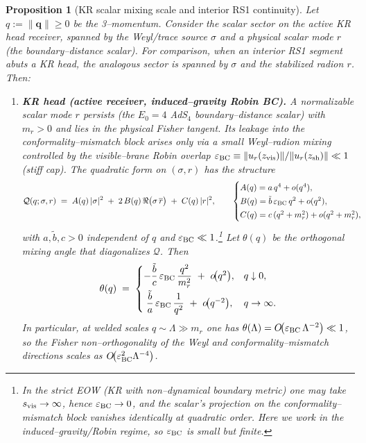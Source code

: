 \documentclass[10pt]{article}
\theoremstyle{definition}
\theoremstyle{plain}
\newtheorem{proposition}{Proposition}[section]
\begin{document}
\begin{proposition}[KR scalar mixing scale and interior RS1 continuity]
\label{prop:scalar-mix}
Let $q:=\|\mathbf q\|\ge 0$ be the 3–momentum. Consider the \emph{scalar} sector on the active KR head
receiver, spanned by the Weyl/trace source $\sigma$ and a physical scalar mode $r$ (the
boundary–distance scalar). For comparison, when an interior RS1 segment abuts a KR head,
the analogous sector is spanned by $\sigma$ and the stabilized radion $r$. Then:
\begin{enumerate}[leftmargin=2.0em,label=(\roman*)]

\item \textbf{KR head (active receiver, induced–gravity Robin BC).}
A normalizable scalar mode $r$ \emph{persists} (the $E_0=4$ AdS$_4$ boundary–distance scalar) with
$m_r>0$ and lies in the \emph{physical} Fisher tangent. Its leakage into the conformality–mismatch
block arises only via a small Weyl–radion mixing controlled by the visible–brane Robin overlap
$\varepsilon_{\rm BC}\equiv \|u_r(z_{\rm vis})\|/\|u_r(z_{\rm sh})\|\ll 1$ (stiff cap).
The quadratic form on $(\sigma,r)$ has the structure
\begin{equation}
\label{eq:KR-ABC-scaling}
\mathcal Q(q;\sigma,r)\;=\;
A(q)\,|\sigma|^2\;+\;2\,B(q)\,\Re\big(\sigma\,\overline{r}\big)\;+\;C(q)\,|r|^2,
\qquad
\begin{cases}
A(q)=a\,q^{4}+o(q^{4}),\\[2pt]
B(q)=\tilde b\,\varepsilon_{\rm BC}\,q^{2}+o(q^{2}),\\[2pt]
C(q)=c\,(q^{2}+m_{r}^{2})+o(q^{2}+m_{r}^{2}),
\end{cases}
\end{equation}
with $a,\tilde b,c>0$ independent of $q$ and $\varepsilon_{\rm BC}\ll 1$.\footnote{In the \emph{strict} EOW
(KR with non–dynamical boundary metric) one may take $s_{\rm vis}\to\infty$, hence $\varepsilon_{\rm BC}\to 0$,
and the scalar’s projection on the conformality–mismatch block vanishes \emph{identically} at quadratic order.
Here we work in the induced–gravity/Robin regime, so $\varepsilon_{\rm BC}$ is small but finite.}
Let $\theta(q)$ be the orthogonal mixing angle that diagonalizes $\mathcal Q$.
Then
\begin{equation}
\label{eq:KR-theta-asymp}
\theta(q)\;=\;
\begin{cases}
-\dfrac{\tilde b}{c}\,\varepsilon_{\rm BC}\,\dfrac{q^{2}}{m_{r}^{2}}\ +\ o\!\big(q^{2}\big), & q\downarrow 0,\\[8pt]
\;\dfrac{\tilde b}{a}\,\varepsilon_{\rm BC}\,\dfrac{1}{q^{2}}\ +\ o\!\big(q^{-2}\big), & q\to\infty.
\end{cases}
\end{equation}
In particular, at welded scales $q\sim\Lambda\gg m_r$ one has
$\theta(\Lambda)=O\!\big(\varepsilon_{\rm BC}\,\Lambda^{-2}\big)\ll 1$, so the
Fisher non–orthogonality of the Weyl and conformality–mismatch directions scales as
$O\!\big(\varepsilon_{\rm BC}^{2}\Lambda^{-4}\big)$.


\end{enumerate}
\end{proposition}
\end{document}
